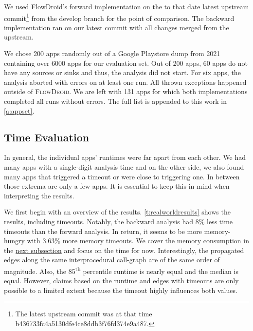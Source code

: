 \documentclass[../draft.tex]{subfiles}
\begin{document}
    We used FlowDroid's forward implementation on the to that date latest upstream commit\footnote{The latest upstream commit was at that time b436733fc4a5130dfe4ce8ddb3f76fd374e9a487.} from the develop branch for the point of comparison.
    The backward implementation ran on our latest commit with all changes merged from the upstream.

    We chose 200 apps randomly out of a Google Playstore dump from 2021 containing over 6000 apps for our evaluation set.
    Out of 200 apps, 60 apps do not have any sources or sinks and thus, the analysis did not start.
    For six apps, the analysis aborted with errors on at least one run. All thrown exceptions happened outside of \textsc{FlowDroid}.
    We are left with 131 apps for which both implementations completed all runs without errors.
    The full list is appended to this work in \autoref{a:appset}.

    \FloatBarrier
    \subsection{Time Evaluation}
    In general, the individual apps' runtimes were far apart from each other. 
    We had many apps with a single-digit analysis time and on the other side, we also found many apps that triggered a timeout or were close to triggering one. 
    In between those extrema are only a few apps.
    It is essential to keep this in mind when interpreting the results.

    We first begin with an overview of the results. 
    \autoref{t:realworldresults} shows the results, including timeouts. 
    Notably, the backward analysis had $8\%$ less time timeouts than the forward analysis. 
    In return, it seems to be more memory-hungry with $3.63\%$ more memory timeouts. 
    We cover the memory consumption in the \hyperref[s:memex]{next subsection} and focus on the time for now. 
    Interestingly, the propagated edges along the same interprocedural call-graph are of the same order of magnitude.
    Also, the 85\textsuperscript{th} percentile runtime is nearly equal and the median is equal.  
    However, claims based on the runtime and edges with timeouts are only possible to a limited extent because the timeout highly influences both values.
\end{document}
